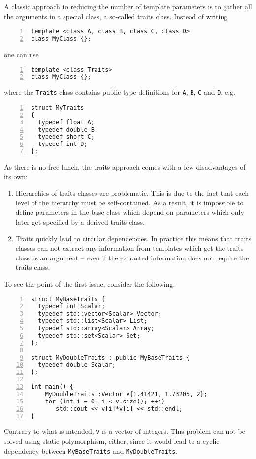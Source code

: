 A classic approach to reducing the number of template parameters is to
gather all the arguments in a special class, a so-called traits
class. Instead of writing
\begin{lstlisting}[basicstyle=\ttfamily\scriptsize,numbers=left,numberstyle=\tiny, numbersep=5pt]
template <class A, class B, class C, class D>
class MyClass {};
\end{lstlisting}
one can use 
\begin{lstlisting}[basicstyle=\ttfamily\scriptsize,numbers=left,numberstyle=\tiny, numbersep=5pt]
template <class Traits>
class MyClass {};
\end{lstlisting}
where the \texttt{Traits} class contains public type definitions for
\texttt{A}, \texttt{B}, \texttt{C} and \texttt{D}, e.g.
\begin{lstlisting}[basicstyle=\ttfamily\scriptsize,numbers=left,numberstyle=\tiny, numbersep=5pt]
struct MyTraits 
{
  typedef float A;
  typedef double B;
  typedef short C;
  typedef int D;
};
\end{lstlisting}

\noindent
As there is no free lunch, the traits approach comes with a few
disadvantages of its own:
\begin{enumerate}
\item Hierarchies of traits classes are problematic. This is due to
  the fact that each level of the hierarchy must be self-contained. As
  a result, it is impossible to define parameters in the base class
  which depend on parameters which only later get specified by a
  derived traits class.
\item Traits quickly lead to circular dependencies. In practice
  this means that traits classes can not extract any information from
  templates which get the traits class as an argument -- even if the
  extracted information does not require the traits class.
\end{enumerate}

\noindent
To see the point of the first issue, consider the following:
\begin{lstlisting}[basicstyle=\ttfamily\scriptsize,numbers=left,numberstyle=\tiny, numbersep=5pt]
struct MyBaseTraits {
  typedef int Scalar;
  typedef std::vector<Scalar> Vector;
  typedef std::list<Scalar> List;
  typedef std::array<Scalar> Array;
  typedef std::set<Scalar> Set;
};

struct MyDoubleTraits : public MyBaseTraits {
  typedef double Scalar;
};

int main() {
    MyDoubleTraits::Vector v{1.41421, 1.73205, 2};
    for (int i = 0; i < v.size(); ++i)
       std::cout << v[i]*v[i] << std::endl;
}
\end{lstlisting}
Contrary to what is intended, \texttt{v} is a vector of integers. This
problem can not be solved using static polymorphism, either, since it
would lead to a cyclic dependency between \texttt{MyBaseTraits} and
\texttt{MyDoubleTraits}.

